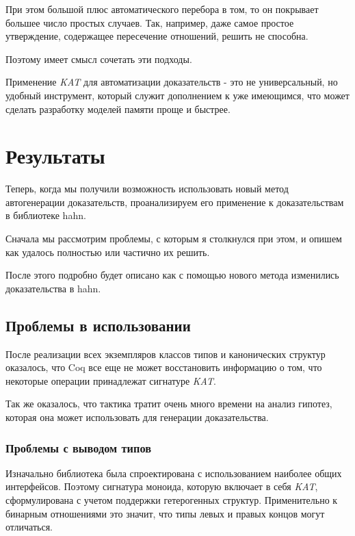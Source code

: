 \documentclass[times
              ]{itmo-student-thesis}
\begin{document}
    При этом большой плюс автоматического перебора в том, то он покрывает большее число простых
    случаев. Так, например, даже самое простое утверждение, содержащее пересечение отношений,
     решить не способна.

    Поэтому имеет смысл сочетать эти подходы.
    
  \chapterconclusion
    Применение \textit{KAT} для автоматизации доказательств - это не универсальный, но удобный
    инструмент, который служит дополнением к уже имеющимся, что может сделать  разработку моделей
    памяти проще и быстрее.

\chapter{Результаты}

  Теперь, когда мы получили возможность использовать новый метод автогенерации доказательств, проанализируем его
  применение к доказательствам в библиотеке hahn.

  Сначала мы рассмотрим проблемы, с которым я столкнулся при этом, и опишем как удалось полностью или
  частично их решить.

  После этого подробно будет описано как с помощью нового метода изменились доказательства в hahn. 

  \section{Проблемы в использовании }
    После реализации всех экземпляров классов типов и канонических структур оказалось, что Coq все еще
    не может восстановить информацию о том, что некоторые операции принадлежат сигнатуре \textit{KAT}.

    Так же оказалось, что тактика  тратит очень много времени на анализ гипотез, которая она
    может использовать для генерации доказательства.
    \subsection{Проблемы с выводом типов}
      Изначально библиотека была спроектирована с использованием наиболее общих интерфейсов. Поэтому
      сигнатура моноида, которую включает в себя \textit{KAT}, сформулирована с учетом
      поддержки гетерогенных структур. 
      Применительно к бинарным отношениями это значит, что типы левых и правых концов могут
      отличаться.
\end{document}
